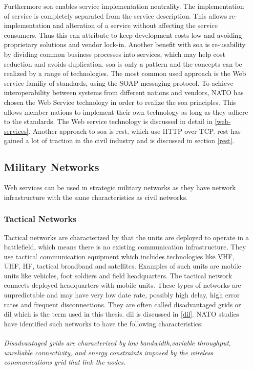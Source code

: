 \documentclass[USenglish]{ifimaster}
\begin{document}
 Furthermore \gls{soa} enables service implementation neutrality. The
implementation of service is completely separated from the service description.
This allows re-implementation and alteration of a service without affecting the
service consumers. Thus this can attribute to keep development costs low and
avoiding proprietary solutions and vendor lock-in. Another benefit with
\gls{soa} is re-usability by dividing common business processes into services,
which may help cost reduction and avoids duplication. \gls{soa} is only a
pattern and the concepts can be realized by a range of technologies. The most
common used approach is the Web service familiy of standards, using the SOAP
messaging protocol. To achieve interoperability between systems from different
nations and vendors, NATO has chosen the Web Service technology in order to
realize the \gls{soa}  principles\cite{soa-baseline}. This allows member nations to implement
their own technology as long as they adhere to the standards. The Web service
technology is discussed in detail in \cref{web-services}. Another approach to
\gls{soa} is \gls{rest}, which use HTTP over TCP. \gls{rest} has gained a lot
of traction in the civil industry and is discussed in section \cref{rest}.

\subsection{Military Networks}
Web services can be used in strategic military networks as they have network
infrastructure with the same characteristics as civil networks.

\subsubsection{Tactical Networks}
Tactical networks are characterized by that the units are deployed to operate in
a battlefield, which means there is no existing communication infrastructure.
They use tactical communication equipment which includes technologies like VHF,
UHF, HF, tactical broadband and satellites\cite{IST-090}.
Examples of such units are mobile units like vehicles, foot soldiers and field
headquarters. The tactical network connects deployed headquarters with mobile
units. These types of networks are unpredictable and may have very low date
rate, possibly high delay, high error rates and frequent disconnections. They
are often called disadvantaged grids or \gls{dil} which is the term used in this
thesis. \gls{dil} is discussed in \cref{dil}. NATO studies have identified such
networks to have the following characteristics:
\\\\
\textit{
Disadvantaged grids are characterized by low bandwidth,variable throughput,
unreliable connectivity, and energy constraints imposed by the wireless
communications grid that link the nodes}\cite{nato-disadvantaged-grids}.
\end{document}

